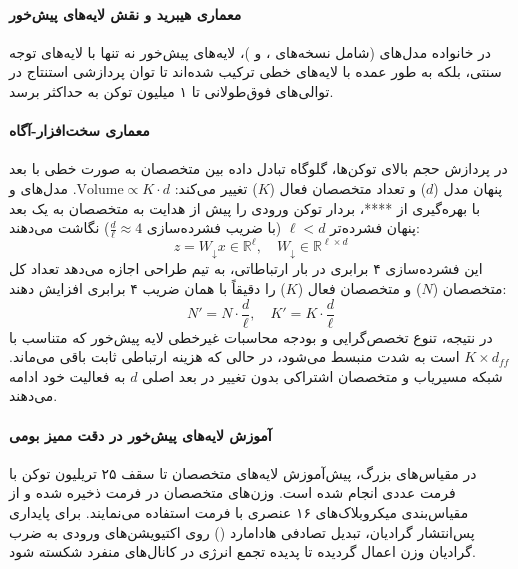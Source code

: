 \item {}

\paragraph*{معماری هیبرید  و نقش لایه‌های پیش‌خور}
در خانواده مدل‌های  \cite{nvidia2025nemotron3} (شامل نسخه‌های ،  و )، لایه‌های پیش‌خور  نه تنها با لایه‌های توجه سنتی، بلکه به طور عمده با لایه‌های خطی  \cite{dao2024transformers} ترکیب شده‌اند تا توان پردازشی استنتاج در توالی‌های فوق‌طولانی تا ۱ میلیون توکن به حداکثر برسد.

\paragraph*{معماری سخت‌افزار-آگاه }
در پردازش حجم بالای توکن‌ها، گلوگاه تبادل داده بین متخصصان به صورت خطی با بعد پنهان مدل ($d$) و تعداد متخصصان فعال ($K$) تغییر می‌کند: $\text{Volume} \propto K \cdot d$. مدل‌های  و  با بهره‌گیری از ****، بردار توکن ورودی را پیش از هدایت به متخصصان به یک بعد پنهان فشرده‌تر $\ell < d$ (با ضریب فشرده‌سازی $\frac{d}{\ell} \approx 4$) نگاشت می‌دهند:
\begin{equation}
    z = W_\downarrow x \in \mathbb{R}^\ell, \quad W_\downarrow \in \mathbb{R}^{\ell \times d}
\end{equation}
این فشرده‌سازی ۴ برابری در بار ارتباطاتی، به تیم طراحی اجازه می‌دهد تعداد کل متخصصان ($N$) و متخصصان فعال ($K$) را دقیقاً با همان ضریب ۴ برابری افزایش دهند:
\begin{equation}
    N' = N \cdot \frac{d}{\ell}, \quad K' = K \cdot \frac{d}{\ell}
\end{equation}
در نتیجه، تنوع تخصص‌گرایی و بودجه محاسبات غیرخطی لایه پیش‌خور که متناسب با $K \times d_{ff}$ است به شدت منبسط می‌شود، در حالی که هزینه ارتباطی ثابت باقی می‌ماند. شبکه مسیریاب و متخصصان اشتراکی بدون تغییر در بعد اصلی $d$ به فعالیت خود ادامه می‌دهند.

\paragraph*{آموزش لایه‌های پیش‌خور در دقت ممیز بومی }
در مقیاس‌های بزرگ، پیش‌آموزش لایه‌های متخصصان تا سقف ۲۵ تریلیون توکن با فرمت عددی  انجام شده است. وزن‌های متخصصان در فرمت  ذخیره شده و از مقیاس‌بندی میکروبلاک‌های ۱۶ عنصری با فرمت  استفاده می‌نمایند. برای پایداری پس‌انتشار گرادیان، تبدیل تصادفی هادامارد () روی اکتیویشن‌های ورودی به ضرب گرادیان وزن اعمال گردیده تا پدیده تجمع انرژی در کانال‌های منفرد شکسته شود.

